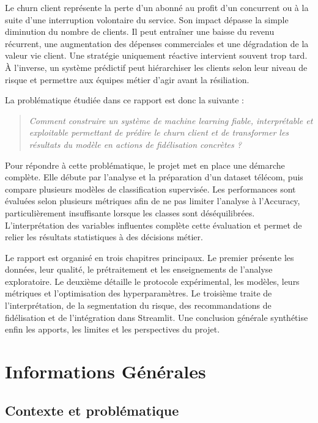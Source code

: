 \documentclass[12pt, a4paper]{article}
\begin{document}
Le churn client représente la perte d'un abonné au profit d'un concurrent ou
à la suite d'une interruption volontaire du service. Son impact dépasse la
simple diminution du nombre de clients. Il peut entraîner une baisse du revenu
récurrent, une augmentation des dépenses commerciales et une dégradation de la
valeur vie client. Une stratégie uniquement réactive intervient souvent trop
tard. À l'inverse, un système prédictif peut hiérarchiser les clients selon
leur niveau de risque et permettre aux équipes métier d'agir avant la
résiliation.

La problématique étudiée dans ce rapport est donc la suivante :
\begin{quote}
\textit{Comment construire un système de machine learning fiable,
interprétable et exploitable permettant de prédire le churn client et de
transformer les résultats du modèle en actions de fidélisation concrètes ?}
\end{quote}

Pour répondre à cette problématique, le projet met en place une démarche
complète. Elle débute par l'analyse et la préparation d'un dataset télécom,
puis compare plusieurs modèles de classification supervisée. Les performances
sont évaluées selon plusieurs métriques afin de ne pas limiter l'analyse à
l'Accuracy, particulièrement insuffisante lorsque les classes sont
déséquilibrées. L'interprétation des variables influentes complète cette
évaluation et permet de relier les résultats statistiques à des décisions
métier.

Le rapport est organisé en trois chapitres principaux. Le premier présente les
données, leur qualité, le prétraitement et les enseignements de l'analyse
exploratoire. Le deuxième détaille le protocole expérimental, les modèles,
leurs métriques et l'optimisation des hyperparamètres. Le troisième traite de
l'interprétation, de la segmentation du risque, des recommandations de
fidélisation et de l'intégration dans Streamlit. Une conclusion générale
synthétise enfin les apports, les limites et les perspectives du projet.

\newpage

\section{Informations Générales}

\subsection{Contexte et problématique}
\end{document}
